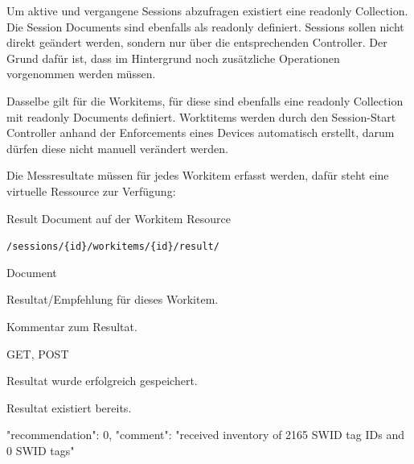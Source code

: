 Um aktive und vergangene Sessions abzufragen existiert eine readonly
Collection. Die Session Documents sind ebenfalls als readonly definiert.
Sessions sollen nicht direkt geändert werden, sondern nur über die
entsprechenden Controller. Der Grund dafür ist, dass im Hintergrund noch
zusätzliche Operationen vorgenommen werden müssen.

Dasselbe gilt für die Workitems, für diese sind ebenfalls eine readonly
Collection mit readonly Documents definiert. Worktitems werden durch den
Session-Start Controller anhand der Enforcements eines Devices automatisch
erstellt, darum dürfen diese nicht manuell verändert werden.

Die Messresultate müssen für jedes Workitem erfasst werden, dafür steht eine
virtuelle Ressource zur Verfügung:

\begin{listing}[H]
\caption{Result Document auf der Workitem Resource}
\begin{mdframed}[style=def]
\begin{description*}
	\item[URI Path] \texttt{/sessions/\{id\}/workitems/\{id\}/result/}
	\item[Archetype] Document
	\item[Request Parameter] \hfill
	\begin{description*}
		\item[\texttt{recommendation}] Resultat/Empfehlung für dieses Workitem.
		\item[\texttt{comment}] Kommentar zum Resultat.
	\end{description*}
	\item[Methods] GET, POST
	\item[Response Statuscodes] \hfill
		\begin{description*}
			\item[201 Created] Resultat wurde erfolgreich gespeichert.
			\item[409 Conflict] Resultat existiert bereits.
		\end{description*}
	\item[JSON Format Response] \hfill
\begin{jsoncode}
{
	"recommendation": 0,
	"comment": "received inventory of 2165 SWID tag IDs and 0 SWID tags"
}
\end{jsoncode}
\end{description*}
\end{mdframed}
\end{listing}

